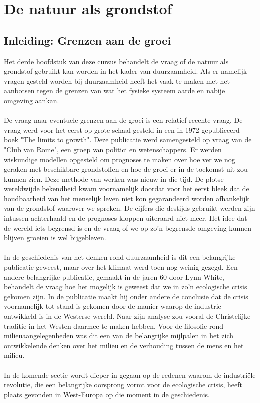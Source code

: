 \documentclass[../summary.tex]{subfiles}
\begin{document}
	
	\section{De natuur als grondstof}
	\subsection{Inleiding: Grenzen aan de groei}
	Het derde hoofdstuk van deze cursus behandelt de vraag of de natuur als grondstof gebruikt kan worden in het kader van duurzaamheid.  Als er  namelijk vragen gesteld worden bij duurzaamheid heeft het vaak te maken met het aanbotsen tegen de grenzen van wat het fysieke systeem aarde en nabije omgeving aankan. \\
	\\
	De vraag naar eventuele grenzen aan de groei is een relatief recente vraag.  De vraag werd voor het eerst op grote schaal gesteld in een in 1972 gepubliceerd boek  "The limits to growth". Deze publicatie werd samengesteld op vraag van de "Club van Rome", een groep van politici en wetenschappers. Er werden wiskundige modellen opgesteld om prognoses te maken over hoe ver we nog geraken met beschikbare grondstoffen en hoe de groei er in de toekomst uit zou kunnen zien. Deze methode van werken was nieuw in die tijd. De plotse wereldwijde bekendheid kwam voornamelijk doordat voor het eerst bleek dat de houdbaarheid van het menselijk leven niet kon gegarandeerd worden afhankelijk van de grondstof waarover we spreken. De cijfers die destijds gebruikt werden zijn intussen achterhaald en de prognoses kloppen uiteraard niet meer. Het idee dat de wereld iets begrensd is en de vraag of we op zo'n begrensde omgeving kunnen blijven groeien is wel bijgebleven. \\
	\\
	In de geschiedenis van het denken rond duurzaamheid is dit een belangrijke publicatie geweest, maar over het klimaat werd toen nog weinig gezegd.  Een andere belangrijke publicatie, gemaakt in de jaren 60 door Lynn White, behandelt de vraag hoe het mogelijk is geweest dat we in zo'n ecologische crisis gekomen zijn. In de publicatie maakt hij onder andere de conclusie dat de crisis voornamelijk tot stand is gekomen door de manier waarop de industrie ontwikkeld is in de Westerse wereld. Naar zijn analyse zou vooral de Christelijke traditie in het Westen daarmee te maken hebben. Voor de filosofie rond milieuaangelegenheden was dit een van de belangrijke mijlpalen in het zich ontwikkelende denken over het milieu en de verhouding tussen de mens en het milieu.\\
	\\
	In de komende sectie wordt dieper in gegaan op de redenen waarom de industriële revolutie, die een belangrijke oorsprong vormt voor de ecologische crisis, heeft plaats gevonden in West-Europa op die moment in de geschiedenis.
\end{document}
